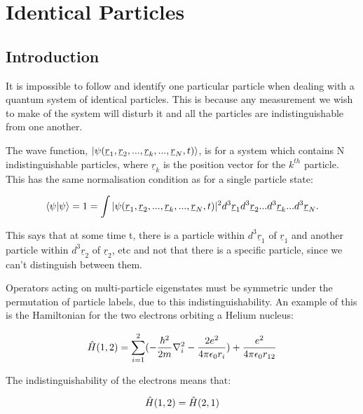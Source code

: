 \chapter{Identical Particles}
\label{chapt5}


\section{Introduction}

It is impossible to follow and identify one particular particle when dealing with a quantum system of identical particles. This is because any measurement we wish to make of the system will disturb it and all the particles are indistinguishable from one another.

\noindent The wave function, $\ket{\psi(\underline{r}_1, \underline{r}_2, ..., \underline{r}_k, ..., \underline{r}_N, t)}$, is for a system which contains N indistinguishable particles, where $\underline{r}_k$ is the position vector for the $k^{th}$ particle. This has the same normalisation condition as for a single particle state:

\begin{equation}
    \braket{\psi | \psi} = 1 = \int | \psi(\underline{r}_1, \underline{r}_2, ..., \underline{r}_k, ..., \underline{r}_N, t) |^2 d^3\underline{r}_1 d^3\underline{r}_2 ... d^3\underline{r}_k ... d^3\underline{r}_N.
    \label{ManyParticleNormalisation}
\end{equation}

\noindent This says that at some time t, there is a particle within $d^3\underline{r}_1$ of $\underline{r}_1$ and another particle within $d^3\underline{r}_2$ of $\underline{r}_2$, etc and not that there is a specific particle, since we can't distinguish between them.

\noindent Operators acting on multi-particle eigenstates must be symmetric under the permutation of particle labels, due to this indistinguishability. An example of this is the Hamiltonian for the two electrons orbiting a Helium nucleus:

\begin{equation}
    \Hat{H}(1, 2) = \sum_{i=1}^2 (-\frac{\hbar^2}{2m}\nabla^2_i - \frac{2e^2}{4 \pi \epsilon_0 r_i}) + \frac{e^2}{4 \pi \epsilon_0 r_{12}}
    \label{HeliumAtomHamiltonian}
\end{equation}

\noindent The indistinguishability of the electrons means that:

\begin{equation}
    \Hat{H}(1, 2) = \Hat{H}(2, 1)
    \label{ExchangeDegeneracy}
\end{equation}

